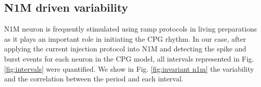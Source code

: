 \subsection{N1M driven variability}
\label{subsec:n1m driven}

N1M neuron is frequently stimulated using ramp protocols in living preparations \parencite{elliott_temporal_1991} as it plays an important role in initiating the CPG rhythm. In our case, after applying the current injection protocol into N1M and detecting the spike and burst events for each neuron in the CPG model, all  intervals represented in Fig. \ref{fig:intervals} were quantified. We show in Fig. \ref{fig:invariant n1m} the variability and the correlation between the period and each interval.

\begin{figure}[hbt!]
	\begin{minipage}[b]{0.45\textwidth}
		\centering

\end{minipage}
\end{figure}
